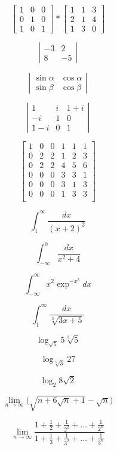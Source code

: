 \documentclass[a4paper]{article}
\begin{document}
$$\left[ 
\begin{array}{ccc}
1 & 0 & 0 \\
0 & 1 & 0 \\
1 & 0 & 1
\end{array}
\right]
*
\left[
\begin{array}{ccc} 
1 & 1 & 3 \\
2 & 1 & 4 \\
1 & 3 & 0
\end{array}
\right]
$$

$$ \left|
\begin{array}{cc}
-3 & 2 \\
8 & -5
\end{array}
\right| $$

$$ \left|
\begin{array}{cc}
\sin{\alpha} & \cos{\alpha} \\
\sin{\beta} & \cos{\beta} 
\end{array}
\right| $$

$$ \left|
\begin{array}{ccc}
1 & i & 1+i \\
-i & 1 & 0 \\
1-i & 0 & 1
\end{array}
\right| $$

$$ \left[
\begin{array}{c|cc|ccc}
1 & 0 & 0 & 1 & 1 & 1 \\
\hline
0 & 2 & 2 & 1 & 2 & 3 \\
0 & 2 & 2 & 4 & 5 & 6 \\
\hline
0 & 0 & 0 & 3 & 3 & 1 \\
0 & 0 & 0 & 3 & 1 & 3 \\
0 & 0 & 0 & 1 & 3 & 3 \\ 
\end{array}
\right] $$

$$ \int_{1}^{\infty} \frac{dx}{(x+2)^{2}} $$

$$ \int_{- \infty}^{0} \frac{dx}{x^{2}+4} $$

$$ \int_{- \infty}^{\infty} x^{2} \exp^{-x^{3}} dx $$

$$ \int_{1}^{\infty} \frac{dx}{\sqrt[3]{3x+5}} $$

$$ \log_{\sqrt{5}}5 \sqrt[3]{5} $$

$$ \log_{\sqrt[3]{3}}27 $$

$$ \log_{2}8 \sqrt{2} $$

$$ \lim_{n \to \infty} \bigg( \sqrt{n + 6 \sqrt{n} + 1} - \sqrt{n} \bigg) $$

$$ \lim_{n \to \infty} \frac{1 + \frac{1}{2} + \frac{1}{2^{2}} + \ldots + \frac{1}{2^{n}}}{1 + \frac{1}{3} + \frac{1}{3^{2}} + \ldots + \frac{1}{3^{n}}} $$
\end{document}
